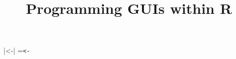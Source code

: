 \newcommand{\tagger}[1]{\texttt{#1}}
\newcommand{\tagattr}[2]{\texttt{#1}} %

\usepackage{fancyvrb}
\DefineShortVerb{\|}
|<-|
\newcommand{\leftBracket}{$<$}
\newcommand{\rightBracket}{$>$}
\newsavebox{\hlboxlessthan}%
\setbox\hlboxlessthan=\hbox{\verb.<-.}%
\newcommand{\ASSIGN}{{}{\usebox{\hlboxlessthan}}{}}
\newcommand{\backslashn}{\code{$\backslash$n}} %

\newcommand{\GTK}{GTK+}
\newcommand{\TCL}{Tcl}
\newcommand{\Tcl}{\TCL}
\newcommand{\TK}{Tk}
\newcommand{\Tk}{Tk}
\newcommand{\tcltk}{Tcl/Tk}
\newcommand{\Qt}{Qt}
\newcommand{\wxWidgets}{wxWidgets}
\newcommand{\Java}{Java}
\newcommand{\gWidgets}{gWidgets}

\newcommand{\TITLE}{Programming GUIs within R}
\title{\TITLE}
\newcommand{\PACKAGENAME}{ProgGUIInR}
\newcommand{\WINDOZE}{Windows}
\newcommand{\UNIX}{Unix}
\newcommand{\LINUX}{Linux}
\newcommand{\OSX}{Mac OS X}



\usepackage{color}




\usepackage{fancyvrb}
\usepackage{multicol}          %

\usepackage{prelim2e}           %
\renewcommand{\PrelimWords}{Draft version, do not circulate}


\usepackage{lscape}             %


\usepackage{natbib}

